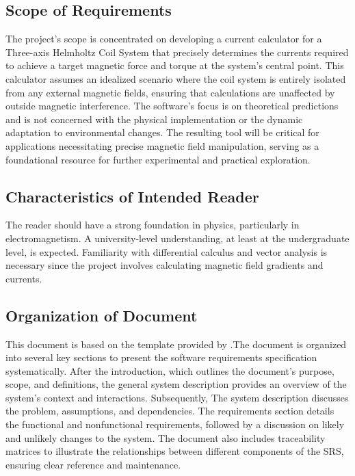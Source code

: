 \documentclass[12pt]{article}
\begin{document}
\subsection{Scope of Requirements} 
{
The project's scope is concentrated on developing a current calculator for a Three-axis Helmholtz Coil System that precisely determines the currents required to achieve a target magnetic force and torque at the system's central point. This calculator assumes an idealized scenario where the coil system is entirely isolated from any external magnetic fields, ensuring that calculations are unaffected by outside magnetic interference. The software's focus is on theoretical predictions and is not concerned with the physical implementation or the dynamic adaptation to environmental changes. The resulting tool will be critical for applications necessitating precise magnetic field manipulation, serving as a foundational resource for further experimental and practical exploration.
}  

\subsection{Characteristics of Intended Reader} \label{sec_IntendedReader}
{
The reader should have a strong foundation in physics, particularly in electromagnetism. A university-level understanding, at least at the undergraduate level, is expected. Familiarity with differential calculus and vector analysis is necessary since the project involves calculating magnetic field gradients and currents.

}

\subsection{Organization of Document}
{
This document is based on the template provided by \citet{SmithandLai2005}.The document is organized into several key sections to present the software requirements specification systematically. After the introduction, which outlines the document's purpose, scope, and definitions, the general system description provides an overview of the system's context and interactions. Subsequently, The system description discusses the problem, assumptions, and dependencies. The requirements section details the functional and nonfunctional requirements, followed by a discussion on likely and unlikely changes to the system. The document also includes traceability matrices to illustrate the relationships between different components of the SRS, ensuring clear reference and maintenance.
}
\end{document}

